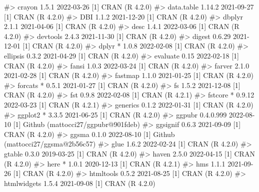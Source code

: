 \documentclass[
  11pt,
  letterpaper,
  DIV=11,
  numbers=noendperiod]{scrartcl}
\newenvironment{Shaded}{}{}
\newcommand{\CommentTok}[1]{\textcolor[rgb]{0.42,0.45,0.49}{#1}}
\begin{document}
\begin{Shaded}
\begin{Highlighting}[]
\CommentTok{\#\textgreater{}  crayon        1.5.1     2022{-}03{-}26 [1] CRAN (R 4.2.0)}
\CommentTok{\#\textgreater{}  data.table    1.14.2    2021{-}09{-}27 [1] CRAN (R 4.2.0)}
\CommentTok{\#\textgreater{}  DBI           1.1.2     2021{-}12{-}20 [1] CRAN (R 4.2.0)}
\CommentTok{\#\textgreater{}  dbplyr        2.1.1     2021{-}04{-}06 [1] CRAN (R 4.2.0)}
\CommentTok{\#\textgreater{}  desc          1.4.1     2022{-}03{-}06 [1] CRAN (R 4.2.0)}
\CommentTok{\#\textgreater{}  devtools      2.4.3     2021{-}11{-}30 [1] CRAN (R 4.2.0)}
\CommentTok{\#\textgreater{}  digest        0.6.29    2021{-}12{-}01 [1] CRAN (R 4.2.0)}
\CommentTok{\#\textgreater{}  dplyr       * 1.0.8     2022{-}02{-}08 [1] CRAN (R 4.2.0)}
\CommentTok{\#\textgreater{}  ellipsis      0.3.2     2021{-}04{-}29 [1] CRAN (R 4.2.0)}
\CommentTok{\#\textgreater{}  evaluate      0.15      2022{-}02{-}18 [1] CRAN (R 4.2.0)}
\CommentTok{\#\textgreater{}  fansi         1.0.3     2022{-}03{-}24 [1] CRAN (R 4.2.0)}
\CommentTok{\#\textgreater{}  farver        2.1.0     2021{-}02{-}28 [1] CRAN (R 4.2.0)}
\CommentTok{\#\textgreater{}  fastmap       1.1.0     2021{-}01{-}25 [1] CRAN (R 4.2.0)}
\CommentTok{\#\textgreater{}  forcats     * 0.5.1     2021{-}01{-}27 [1] CRAN (R 4.2.0)}
\CommentTok{\#\textgreater{}  fs            1.5.2     2021{-}12{-}08 [1] CRAN (R 4.2.0)}
\CommentTok{\#\textgreater{}  fst           0.9.8     2022{-}02{-}08 [1] CRAN (R 4.2.1)}
\CommentTok{\#\textgreater{}  fstcore     * 0.9.12    2022{-}03{-}23 [1] CRAN (R 4.2.1)}
\CommentTok{\#\textgreater{}  generics      0.1.2     2022{-}01{-}31 [1] CRAN (R 4.2.0)}
\CommentTok{\#\textgreater{}  ggplot2     * 3.3.5     2021{-}06{-}25 [1] CRAN (R 4.2.0)}
\CommentTok{\#\textgreater{}  ggpubr        0.4.0.999 2022{-}08{-}10 [1] Github (mattocci27/ggpubr@901fdeb)}
\CommentTok{\#\textgreater{}  ggsignif      0.6.3     2021{-}09{-}09 [1] CRAN (R 4.2.0)}
\CommentTok{\#\textgreater{}  ggsma         0.1.0     2022{-}08{-}10 [1] Github (mattocci27/ggsma@2b56c57)}
\CommentTok{\#\textgreater{}  glue          1.6.2     2022{-}02{-}24 [1] CRAN (R 4.2.0)}
\CommentTok{\#\textgreater{}  gtable        0.3.0     2019{-}03{-}25 [1] CRAN (R 4.2.0)}
\CommentTok{\#\textgreater{}  haven         2.5.0     2022{-}04{-}15 [1] CRAN (R 4.2.0)}
\CommentTok{\#\textgreater{}  here        * 1.0.1     2020{-}12{-}13 [1] CRAN (R 4.2.1)}
\CommentTok{\#\textgreater{}  hms           1.1.1     2021{-}09{-}26 [1] CRAN (R 4.2.0)}
\CommentTok{\#\textgreater{}  htmltools     0.5.2     2021{-}08{-}25 [1] CRAN (R 4.2.0)}
\CommentTok{\#\textgreater{}  htmlwidgets   1.5.4     2021{-}09{-}08 [1] CRAN (R 4.2.0)}

\end{Highlighting}
\end{Shaded}
\end{document}
